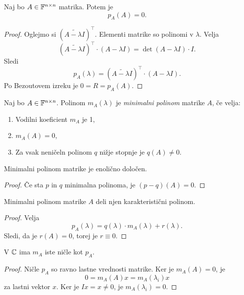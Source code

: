 \documentclass[12pt, a4paper]{article}
\begin{document}
\begin{izrek}
Naj bo $A\in\mathbb{F}^{n\times n}$ matrika. Potem je
\[
p_A(A)=0.
\]
\end{izrek}

\begin{proof}
Oglejmo si $\left(\widetilde{A-\lambda I}\right)^\top$. Elementi matrike so polinomi v $\lambda$. Velja
\[
\left(\widetilde{A-\lambda I}\right)^\top\cdot (A-\lambda I)=\det(A-\lambda I)\cdot I.
\]
Sledi
\[
p_A(\lambda)=\left(\widetilde{A-\lambda I}\right)^\top\cdot(A-\lambda I).
\]
Po Bezoutovem izreku je $0=R=p_A(A)$.
\end{proof}

\begin{definicija}
Naj bo $A\in\mathbb{F}^{n\times n}$. Polinom $m_A(\lambda)$ je \emph{minimalni polinom} matrike $A$, če velja:

\begin{enumerate}[label=\arabic*)]
\item Vodilni koeficient $m_A$ je 1,
\item $m_A(A)=0$,
\item Za vsak neničeln polinom $q$ nižje stopnje je $q(A)\ne 0$.
\end{enumerate}
\end{definicija}

\begin{izrek}
Minimalni polinom matrike je enolično določen.
\end{izrek}

\begin{proof}
Če sta $p$ in $q$ minimalna polinoma, je $(p-q)(A)=0$.
\end{proof}

\begin{trditev}
Minimalni polinom matrike $A$ deli njen karakteristični polinom.
\end{trditev}

\begin{proof}
Velja
\[
p_A(\lambda)=q(\lambda)\cdot m_A(\lambda)+r(\lambda).
\]
Sledi, da je $r(A)=0$, torej je $r\equiv 0$.
\end{proof}

\begin{izrek}
V $\mathbb{C}$ ima $m_A$ iste ničle kot $p_A$.
\end{izrek}

\begin{proof}
Ničle $p_A$ so ravno lastne vrednosti matrike. Ker je $m_A(A)=0$, je
\[
0=m_A(A)x=m_A(\lambda_i)x
\]
za lastni vektor $x$. Ker je $Ix=x\ne 0$, je $m_A(\lambda_i)=0$.
\end{proof}
\end{document}
